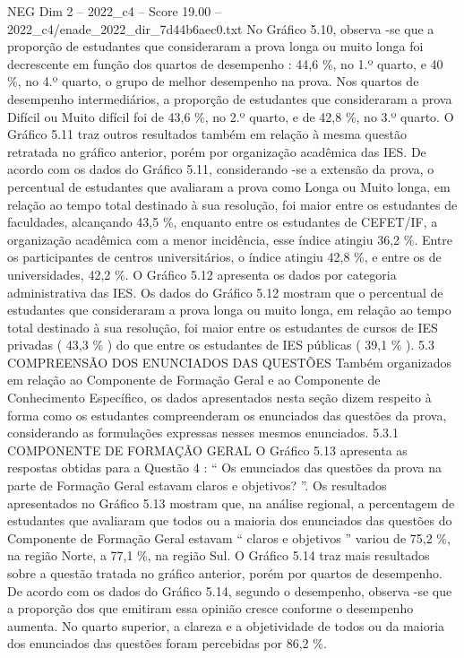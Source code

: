\begin{textsample}{NEG Dim 2 – 2022\_c4 – Score 19.00 – 2022\_c4/enade\_2022\_dir\_7d44b6aec0.txt}
No Gráfico 5.10, observa -se que a proporção de estudantes que consideraram a prova longa ou muito longa foi decrescente em função dos quartos de desempenho : 44,6 \%, no 1.º quarto, e 40 \%, no 4.º quarto, o grupo de melhor desempenho na prova.
Nos quartos de desempenho intermediários, a proporção de estudantes que consideraram a prova Difícil ou Muito difícil foi de 43,6 \%, no 2.º quarto, e de 42,8 \%, no 3.º quarto.
O Gráfico 5.11 traz outros resultados também em relação à mesma questão retratada no gráfico anterior, porém por organização acadêmica das IES.
De acordo com os dados do Gráfico 5.11, considerando -se a extensão da prova, o percentual de estudantes que avaliaram a prova como Longa ou Muito longa, em relação ao tempo total destinado à sua resolução, foi maior entre os estudantes de faculdades, alcançando 43,5 \%, enquanto entre os estudantes de CEFET/IF, a organização acadêmica com a menor incidência, esse índice atingiu 36,2 \%.
Entre os participantes de centros universitários, o índice atingiu 42,8 \%, e entre os de universidades, 42,2 \%.
O Gráfico 5.12 apresenta os dados por categoria administrativa das IES.
Os dados do Gráfico 5.12 mostram que o percentual de estudantes que consideraram a prova longa ou muito longa, em relação ao tempo total destinado à sua resolução, foi maior entre os estudantes de cursos de IES privadas ( 43,3 \% ) do que entre os estudantes de IES públicas ( 39,1 \% ). 5.3 COMPREENSÃO DOS ENUNCIADOS DAS QUESTÕES Também organizados em relação ao Componente de Formação Geral e ao Componente de Conhecimento Específico, os dados apresentados nesta seção dizem respeito à forma como os estudantes compreenderam os enunciados das questões da prova, considerando as formulações expressas nesses mesmos enunciados. 5.3.1 COMPONENTE DE FORMAÇÃO GERAL O Gráfico 5.13 apresenta as respostas obtidas para a Questão 4 : “ Os enunciados das questões da prova na parte de Formação Geral estavam claros e objetivos? ”.
Os resultados apresentados no Gráfico 5.13 mostram que, na análise regional, a percentagem de estudantes que avaliaram que todos ou a maioria dos enunciados das questões do Componente de Formação Geral estavam “ claros e objetivos ” variou de 75,2 \%, na região Norte, a 77,1 \%, na região Sul.
O Gráfico 5.14 traz mais resultados sobre a questão tratada no gráfico anterior, porém por quartos de desempenho.
De acordo com os dados do Gráfico 5.14, segundo o desempenho, observa -se que a proporção dos que emitiram essa opinião cresce conforme o desempenho aumenta.
No quarto superior, a clareza e a objetividade de todos ou da maioria dos enunciados das questões foram percebidas por 86,2 \%.

\end{textsample}
